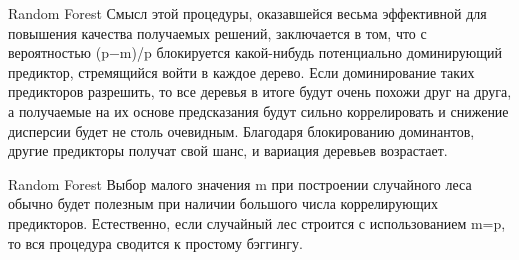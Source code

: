 \documentclass[10pt,pdf,hyperref={unicode}]{beamer}
\begin{document}
\begin{frame}{Random Forest}
Смысл этой процедуры, оказавшейся весьма эффективной для повышения качества получаемых решений, заключается в том, что с вероятностью (p−m)/p
блокируется какой-нибудь потенциально доминирующий предиктор, стремящийся войти в каждое дерево. Если доминирование таких предикторов разрешить, то все деревья в итоге будут очень похожи друг на друга, а получаемые на их основе предсказания будут сильно коррелировать и снижение дисперсии будет не столь очевидным. Благодаря блокированию доминантов, другие предикторы получат свой шанс, и вариация деревьев возрастает.
\end{frame}

\begin{frame}{Random Forest}
Выбор малого значения m при построении случайного леса обычно будет полезным при наличии большого числа коррелирующих предикторов. Естественно, если случайный лес строится с использованием m=p, то вся процедура сводится к простому бэггингу.
\end{frame}


  
\end{document}
